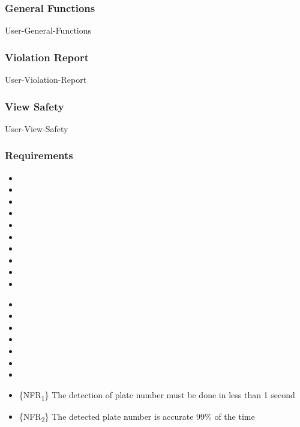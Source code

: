 
\subsubsection{General Functions}

{User-General-Functions}

\subsubsection{Violation Report}

{User-Violation-Report}

\subsubsection{View Safety}

{User-View-Safety}

\subsubsection{Requirements}

\textbf{}

\begin{itemize}
	\item {}
	\item {}
	\item {}
	\item {}
	\item {}
	\item {}
	\item {}
	\item {}
	\item {}
	\item {}

\end{itemize}

\begin{itemize}
	\item {}
	\item {}
	\item {}
	\item {}
	\item {}
	\item {}
	\item {}
\end{itemize}


\begin{itemize}
	\item \{NFR\textsubscript{1}\} The detection of plate number must be done in less than 1 second
	\item \{NFR\textsubscript{2}\} The detected plate number is accurate 99\% of the time

\end{itemize}
	
